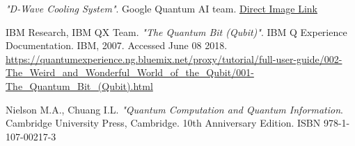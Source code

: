 \documentclass[a4paper]{article}
\begin{document}
\begin{thebibliography}{9}
	\label{sec:bibliography} %








		\emph{"D-Wave Cooling System"}. Google Quantum AI team. \newline \href{https://www.technologyreview.jp/wp-content/uploads/sites/2/2016/09/googlequantumcomputer.jpg}{Direct Image Link}

	IBM Research, IBM QX Team. \emph{"The Quantum Bit (Qubit)"}. IBM Q Experience Documentation. IBM, 2007.  Accessed June 08 2018. 	\href{https://quantumexperience.ng.bluemix.net/proxy/tutorial/full-user-guide/002-The_Weird_and_Wonderful_World_of_the_Qubit/001-The_Quantum_Bit_(Qubit).html}{https://quantumexperience.ng.bluemix.net/proxy/tutorial/full-user-guide/002-The\_Weird\_and\_Wonderful\_World\_of\_the\_Qubit/001-The\_Quantum\_Bit\_(Qubit).html}

	Nielson M.A., Chuang I.L. \emph{"Quantum Computation and Quantum Information}. Cambridge University Press, Cambridge. 10th Anniversary Edition. ISBN 978-1-107-00217-3


\end{thebibliography}
\end{document}
